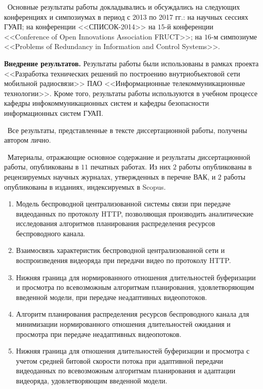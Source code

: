 \probation\ Основные результаты работы докладывались и обсуждались на следующих конференциях и симпозиумах в период с 2013 по 2017 гг.: на научных сессиях ГУАП; на конференции <<СПИСОК-2014>> на $15$-й конференции <<Conference of Open Innovations Association FRUCT>>; на $16$-м симпозиуме <<Problems of Redundancy in Information and Control Systems>>.

\textbf{Внедрение результатов.} Результаты работы были использованы в рамках проекта <<Разработка технических решений по построению внутриобъектовой сети мобильной радиосвязи>> ПАО <<Информационные телекоммуникационные технологии>>. Кроме того, результаты работы используются в учебном процессе кафедры инфокоммуникационных систем и кафедры безопасности информационных систем ГУАП.

\contribution\ Все результаты, представленные в тексте диссертационной работы, получены автором лично.

\publications\ Материалы, отражающие основное содержание и результаты диссертационной работы, опубликованы в $11$ печатных работах. Из них $2$ работы опубликованы в рецензируемых научных журналах, утвержденных в перечне ВАК, и $2$ работы опубликованы в изданиях, индексируемых в Scopus.

\begin{enumerate}
    \item Модель беспроводной централизованной системы связи при передаче видеоданных по протоколу HTTP, позволяющая производить аналитические исследования алгоритмов планирования распределения ресурсов беспроводного канала.
    \item Взаимосвязь характеристик беспроводной централизованной сети и воспроизведения видеоряда при передачи видео по протоколу HTTP.
    \item Нижняя граница для нормированного отношения длительностей буферизации и просмотра по всевозможным алгоритмам планирования, удовлетворяющим введенной модели, при передаче неадаптивных видеопотоков.
    \item Алгоритм планирования распределения ресурсов беспроводного канала для минимизации нормированного отношения длительностей ожидания и просмотра при передаче неадаптивных видеопотоков.
    \item Нижняя граница для отношения длительностей буферизации и просмотра с учетом средней битовой скорости потока при адаптивной передачи видеоданных по всевозможным алгоритмам планирования и адаптации видеоряда, удовлетворяющим введенной модели.
\end{enumerate}
